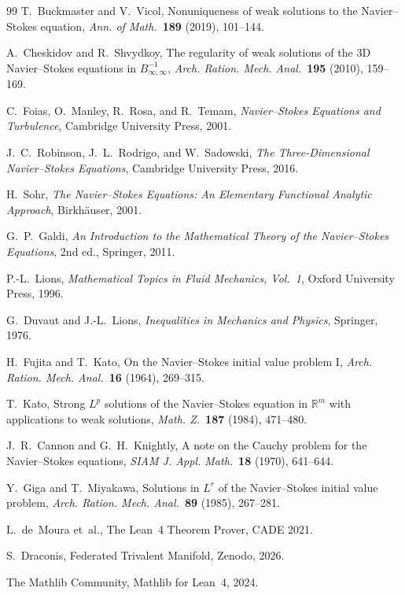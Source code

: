 \documentclass[12pt]{article}
\theoremstyle{plain}
\theoremstyle{definition}
\begin{document}
\begin{thebibliography}{99}
T.~Buckmaster and V.~Vicol,
Nonuniqueness of weak solutions to the Navier--Stokes equation,
\emph{Ann. of Math.}\ \textbf{189} (2019), 101--144.

A.~Cheskidov and R.~Shvydkoy,
The regularity of weak solutions of the 3D Navier--Stokes equations
in $B^{-1}_{\infty,\infty}$,
\emph{Arch. Ration. Mech. Anal.}\ \textbf{195} (2010), 159--169.

C.~Foias, O.~Manley, R.~Rosa, and R.~Temam,
\emph{Navier--Stokes Equations and Turbulence},
Cambridge University Press, 2001.

J.~C.~Robinson, J.~L.~Rodrigo, and W.~Sadowski,
\emph{The Three-Dimensional Navier--Stokes Equations},
Cambridge University Press, 2016.

H.~Sohr,
\emph{The Navier--Stokes Equations: An Elementary Functional
Analytic Approach},
Birkh\"auser, 2001.

G.~P.~Galdi,
\emph{An Introduction to the Mathematical Theory of the Navier--Stokes
Equations}, 2nd ed.,
Springer, 2011.

P.-L.~Lions,
\emph{Mathematical Topics in Fluid Mechanics, Vol.~1},
Oxford University Press, 1996.

G.~Duvaut and J.-L.~Lions,
\emph{Inequalities in Mechanics and Physics},
Springer, 1976.

H.~Fujita and T.~Kato,
On the Navier--Stokes initial value problem I,
\emph{Arch. Ration. Mech. Anal.}\ \textbf{16} (1964), 269--315.

T.~Kato,
Strong $L^p$ solutions of the Navier--Stokes equation in
$\mathbb{R}^m$ with applications to weak solutions,
\emph{Math. Z.}\ \textbf{187} (1984), 471--480.

J.~R.~Cannon and G.~H.~Knightly,
A note on the Cauchy problem for the Navier--Stokes equations,
\emph{SIAM J. Appl. Math.}\ \textbf{18} (1970), 641--644.

Y.~Giga and T.~Miyakawa,
Solutions in $L^r$ of the Navier--Stokes initial value problem,
\emph{Arch. Ration. Mech. Anal.}\ \textbf{89} (1985), 267--281.

L.~de~Moura et~al., The Lean~4 Theorem Prover, CADE 2021.

S.~Draconis, Federated Trivalent Manifold, Zenodo, 2026.

The Mathlib Community, Mathlib for Lean~4, 2024.

\end{thebibliography}
\end{document}
